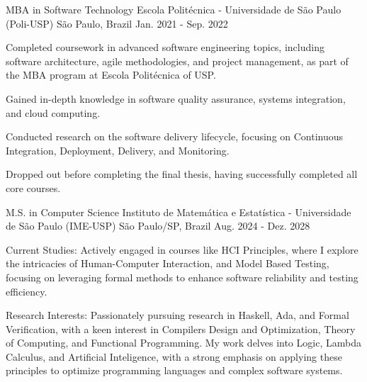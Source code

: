 \begin{cventries}
{    }
  \newline
  \cventry
    {MBA in Software Technology} %
    {Escola Politécnica - Universidade de São Paulo (Poli-USP)} %
    {São Paulo, Brazil} %
    {Jan. 2021 - Sep. 2022} %
    {
      \begin{cvitems} %
        \item {Completed coursework in advanced software engineering topics, including software architecture, agile methodologies, and project management, as part of the MBA program at Escola Politécnica of USP.}
        \item {Gained in-depth knowledge in software quality assurance, systems integration, and cloud computing.}
        \item {Conducted research on the software delivery lifecycle, focusing on Continuous Integration, Deployment, Delivery, and Monitoring.}
        \item {Dropped out before completing the final thesis, having successfully completed all core courses.}
      \end{cvitems}
    }
  \newline
  \cventry
    {M.S. in Computer Science} %
    {Instituto de Matemática e Estatística - Universidade de São Paulo (IME-USP)} %
    {São Paulo/SP, Brazil} %
    {Aug. 2024 - Dez. 2028} %
    {
      \begin{cvitems} %
        \item {Current Studies: Actively engaged in courses like HCI Principles, where I explore the intricacies of Human-Computer Interaction, and Model Based Testing, focusing on leveraging formal methods to enhance software reliability and testing efficiency.}
        \item {Research Interests: Passionately pursuing research in Haskell, Ada, and Formal Verification, with a keen interest in Compilers Design and Optimization, Theory of Computing, and Functional Programming. My work delves into Logic, Lambda Calculus, and Artificial Inteligence, with a strong emphasis on applying these principles to optimize programming languages and complex software systems.}
      \end{cvitems}
    }
    
\end{cventries}
